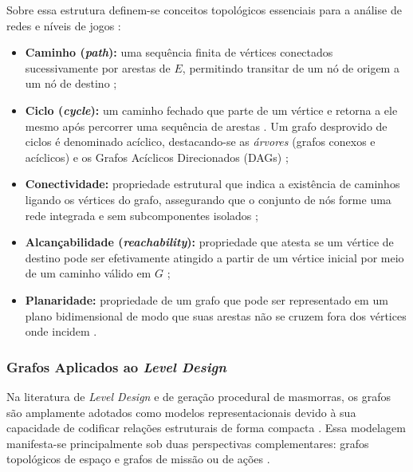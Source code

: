 Sobre essa estrutura definem-se conceitos topológicos essenciais para a análise de redes e níveis de jogos \cite{inproceedings, linden2014dungeons, summerville2018procedural}:
\begin{itemize}
    \item \textbf{Caminho (\textit{path}):} uma sequência finita de vértices conectados sucessivamente por arestas de $E$, permitindo transitar de um nó de origem a um nó de destino \cite{inproceedings, linden2014dungeons};
    \item \textbf{Ciclo (\textit{cycle}):} um caminho fechado que parte de um vértice e retorna a ele mesmo após percorrer uma sequência de arestas \cite{dormans2010, linden2014dungeons}. Um grafo desprovido de ciclos é denominado acíclico, destacando-se as \textit{árvores} (grafos conexos e acíclicos) e os Grafos Acíclicos Direcionados (DAGs) \cite{linden2014dungeons, wang2026designerlyloop};
    \item \textbf{Conectividade:} propriedade estrutural que indica a existência de caminhos ligando os vértices do grafo, assegurando que o conjunto de nós forme uma rede integrada e sem subcomponentes isolados \cite{linden2014dungeons, summerville2018procedural, xu2025databasedrivenframework3dlevel};
    \item \textbf{Alcançabilidade (\textit{reachability}):} propriedade que atesta se um vértice de destino pode ser efetivamente atingido a partir de um vértice inicial por meio de um caminho válido em $G$ \cite{dormans2010, linden2014dungeons, xu2025databasedrivenframework3dlevel};
    \item \textbf{Planaridade:} propriedade de um grafo que pode ser representado em um plano bidimensional de modo que suas arestas não se cruzem fora dos vértices onde incidem \cite{inproceedings}.
\end{itemize}

\subsubsection{Grafos Aplicados ao \textit{Level Design}}
\label{sec:grafos_level_design}

Na literatura de \textit{Level Design} e de geração procedural de masmorras, os grafos são amplamente adotados como modelos representacionais devido à sua capacidade de codificar relações estruturais de forma compacta \cite{dormans2010, inproceedings, linden2014dungeons, summerville2018procedural}. Essa modelagem manifesta-se principalmente sob duas perspectivas complementares: grafos topológicos de espaço e grafos de missão ou de ações \cite{dormans2010, inproceedings, linden2014dungeons}.

